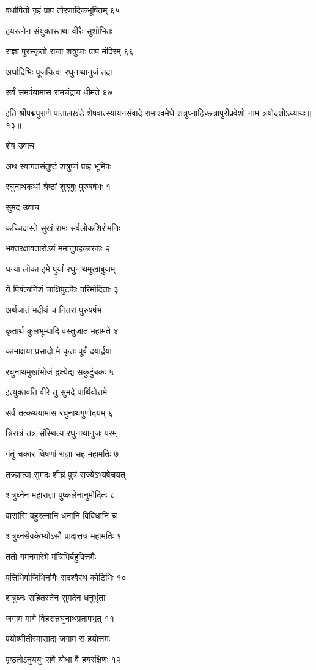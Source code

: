 वर्धापितो गृहं प्राप तोरणादिकभूषितम् ६५

हयरत्नेन संयुक्तस्तथा वीरैः सुशोभितः

राज्ञा पुरस्कृतो राजा शत्रुघ्नः प्राप मंदिरम् ६६

अर्घादिभिः पूजयित्वा रघुनाथानुजं तदा

सर्वं समर्पयामास रामचंद्राय धीमते ६७

इति श्रीपद्मपुराणे पातालखंडे शेषवात्स्यायनसंवादे रामाश्वमेधे शत्रुघ्नाहिच्छत्रापुरीप्रवेशो नाम त्रयोदशोऽध्यायः॥१३॥


शेष उवाच

अथ स्वागतसंतुष्टं शत्रुघ्नं प्राह भूमिपः

रघुनाथकथां श्रेष्ठां शुश्रूषुः पुरुषर्षभः १

सुमद उवाच

कच्चिदास्ते सुखं रामः सर्वलोकशिरोमणिः

भक्तरक्षावतारोऽयं ममानुग्रहकारकः २

धन्या लोका इमे पुर्यां रघुनाथमुखांबुजम्

ये पिबंत्यनिशं चाक्षिपुटकैः परिमोदिताः ३

अर्थजातं मदीयं च नितरां पुरुषर्षभ

कृतार्थं कुलभूम्यादि वस्तुजातं महामते ४

कामाक्षया प्रसादो मे कृतः पूर्वं दयार्द्रया

रघुनाथमुखांभोजं द्रक्ष्येद्य सकुटुंबकः ५

इत्युक्तवति वीरे तु सुमदे पार्थिवोत्तमे

सर्वं तत्कथयामास रघुनाथगुणोदयम् ६

त्रिरात्रं तत्र संस्थित्य रघुनाथानुजः परम्

गंतुं चकार धिषणां राज्ञा सह महामतिः ७

तज्ज्ञात्वा सुमदः शीघ्रं पुत्रं राज्येऽभ्यषेचयत्

शत्रुघ्नेन महाराज्ञा पुष्कलेनानुमोदितः ८

वासांसि बहुरत्नानि धनानि विविधानि च

शत्रुघ्नसेवकेभ्योऽसौ प्रादात्तत्र महामतिः ९

ततो गमनमारेभे मंत्रिभिर्बहुवित्तमैः

पत्तिभिर्वाजिभिर्नागैः सदश्वैरथ कोटिभिः १०

शत्रुघ्नः सहितस्तेन सुमदेन धनुर्भृता

जगाम मार्गे विहसन्रघुनाथप्रतापभृत् ११

पयोष्णीतीरमासाद्य जगाम स हयोत्तमः

पृष्ठतोऽनुययुः सर्वे योधा वै हयरक्षिणः १२

